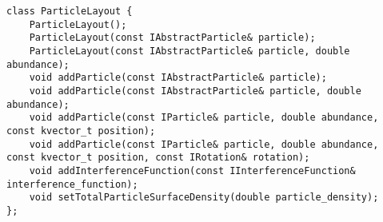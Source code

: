 \setCpp
\begin{lstlisting}
class ParticleLayout {
    ParticleLayout();
    ParticleLayout(const IAbstractParticle& particle);
    ParticleLayout(const IAbstractParticle& particle, double abundance);
    void addParticle(const IAbstractParticle& particle);
    void addParticle(const IAbstractParticle& particle, double abundance);
    void addParticle(const IParticle& particle, double abundance, const kvector_t position);
    void addParticle(const IParticle& particle, double abundance, const kvector_t position, const IRotation& rotation);
    void addInterferenceFunction(const IInterferenceFunction& interference_function);
    void setTotalParticleSurfaceDensity(double particle_density);
};
\end{lstlisting}

